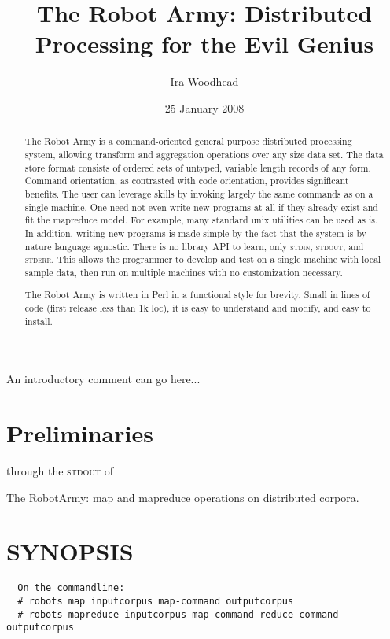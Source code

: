 \documentclass{tufte-handout}
\title{The Robot Army: Distributed Processing for the Evil Genius}
\author{Ira Woodhead}
\date{25 January 2008}  %
\begin{document}
\maketitle %

\begin{abstract}
\noindent 

The Robot Army is a command-oriented general purpose distributed processing system, allowing transform and aggregation operations over any size data set. The data store format consists of ordered sets of untyped, variable length records of any form. Command orientation, as contrasted with code orientation, provides significant benefits. The user can leverage skills by invoking largely the same commands as on a single machine. One need not even write new programs at all if they already exist and fit the mapreduce model. For example, many standard unix utilities can be used as is. In addition, writing new programs is made simple by the fact that the system is by nature language agnostic. There is no library API to learn, only \textsc{stdin}, \textsc{stdout}, and \textsc{stderr}. This allows the programmer to develop and test on a single machine with local sample data, then run on multiple machines with no customization necessary.

The Robot Army is written in Perl in a functional style for brevity. Small in lines of code (first release less than 1k loc), it is easy to understand and modify, and easy to install.

\end{abstract}


An introductory comment can go here...


\section{Preliminaries}\label{sec:preliminaries}


 through the \textsc{stdout} of 


The RobotArmy: map and mapreduce operations on distributed corpora.

\section{SYNOPSIS\label{SYNOPSIS}}
\begin{verbatim}
  On the commandline:
  # robots map inputcorpus map-command outputcorpus
  # robots mapreduce inputcorpus map-command reduce-command outputcorpus
\end{verbatim}
\end{document}
